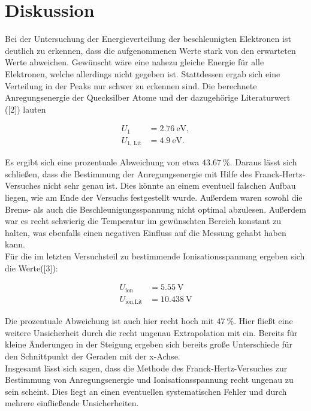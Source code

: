 \section{Diskussion}
\label{sec:Diskussion}

Bei der Untersuchung der Energieverteilung der beschleunigten Elektronen ist deutlich zu 
erkennen, dass die aufgenommenen Werte stark von den erwarteten Werte abweichen. Gewünscht wäre 
eine nahezu gleiche Energie für alle Elektronen, welche allerdings nicht gegeben ist. Stattdessen
ergab sich eine Verteilung in der Peaks nur schwer zu erkennen sind. 
Die berechnete Anregungsenergie der Quecksilber Atome und der dazugehörige Literaturwert ([2])
lauten 

\begin{align*}
U_1 &= \SI{2.76}{\eV},\\
U_\text{1, Lit} &= \SI{4.9}{\eV}.
\end{align*}

Es ergibt sich eine prozentuale Abweichung von etwa $\SI{43.67}{\percent}$. Daraus lässt sich schließen, 
dass die Bestimmung der Anregungsenergie mit Hilfe des Franck-Hertz-Versuches nicht sehr genau ist. Dies
könnte an einem eventuell falschen Aufbau liegen, wie am Ende der Versuchs festgestellt wurde. Außerdem 
waren sowohl die Brems- als auch die Beschleunigungsspannung nicht optimal abzulesen. Außerdem war es 
recht schwierig die Temperatur im gewünschten Bereich konstant zu halten, was ebenfalls einen negativen 
Einfluss auf die Messung gehabt haben kann. \\
Für die im letzten Versuchsteil zu bestimmende Ionisationsspannung ergeben sich die Werte([3]):

\begin{align*}
U_\text{ion} &= \SI{5.55}{\volt}\\
U_\text{ion,Lit} &= \SI{10.438}{\volt}
\end{align*}

Die prozentuale Abweichung ist auch hier recht hoch mit $\SI{47}{\percent}$. Hier fließt eine weitere 
Unsicherheit durch die recht ungenau Extrapolation mit ein. Bereits für kleine Änderungen in der 
Steigung ergeben sich bereits große Unterschiede für den Schnittpunkt der Geraden mit der x-Achse. \\
Insgesamt lässt sich sagen, dass die Methode des Franck-Hertz-Versuches zur Bestimmung von 
Anregungsenergie und Ionisationsspannung recht ungenau zu sein scheint. Dies liegt an einen 
eventuellen systematischen Fehler und durch mehrere einfließende Unsicherheiten. 